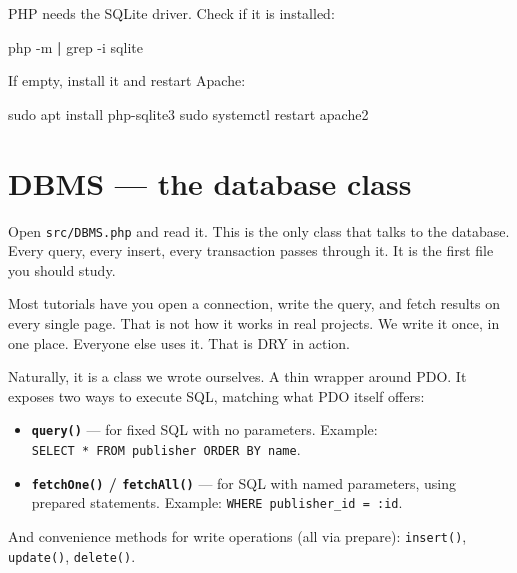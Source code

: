 \documentclass[11pt,a4paper,oneside]{book}
\newenvironment{Shaded}{\begin{snugshade}}{\end{snugshade}}
\newcommand{\KeywordTok}[1]{\textcolor[HTML]{007020}{\textbf{#1}}}
\newcommand{\FunctionTok}[1]{\textcolor[HTML]{06287E}{#1}}
\newcommand{\ExtensionTok}[1]{#1}
\newcommand{\AttributeTok}[1]{\textcolor[HTML]{7D9029}{#1}}
\newcommand{\NormalTok}[1]{#1}
\providecommand{\tightlist}{%
  \setlength{\itemsep}{0pt}\setlength{\parskip}{0pt}}
\begin{document}
PHP needs the SQLite driver. Check if it is installed:

\begin{Shaded}
\begin{Highlighting}[]
\ExtensionTok{php} \AttributeTok{{-}m} \KeywordTok{|} \FunctionTok{grep} \AttributeTok{{-}i}\NormalTok{ sqlite}
\end{Highlighting}
\end{Shaded}

If empty, install it and restart Apache:

\begin{Shaded}
\begin{Highlighting}[]
\FunctionTok{sudo}\NormalTok{ apt install php{-}sqlite3}
\FunctionTok{sudo}\NormalTok{ systemctl restart apache2}
\end{Highlighting}
\end{Shaded}

\hypertarget{dbms-the-database-class}{%
\section{DBMS --- the database
class}\label{dbms-the-database-class}}

Open \texttt{src/DBMS.php} and read it. This is the only class
that talks to the database. Every query, every insert, every
transaction passes through it. It is the first file you should
study.

Most tutorials have you open a connection, write the query, and
fetch results on every single page. That is not how it works in
real projects. We write it once, in one place. Everyone else uses
it. That is DRY in action.

Naturally, it is a class we wrote ourselves. A thin wrapper
around PDO. It exposes two ways to execute SQL, matching what PDO
itself offers:

\begin{itemize}
\tightlist
\item
  \textbf{\texttt{query()}} --- for fixed SQL with no parameters.
  Example: \texttt{SELECT\ *\ FROM\ publisher\ ORDER\ BY\ name}.
\item
  \textbf{\texttt{fetchOne()} / \texttt{fetchAll()}} --- for SQL
  with named parameters, using prepared statements. Example:
  \texttt{WHERE\ publisher\_id\ =\ :id}.
\end{itemize}

And convenience methods for write operations (all via prepare):
\texttt{insert()}, \texttt{update()}, \texttt{delete()}.
\end{document}
